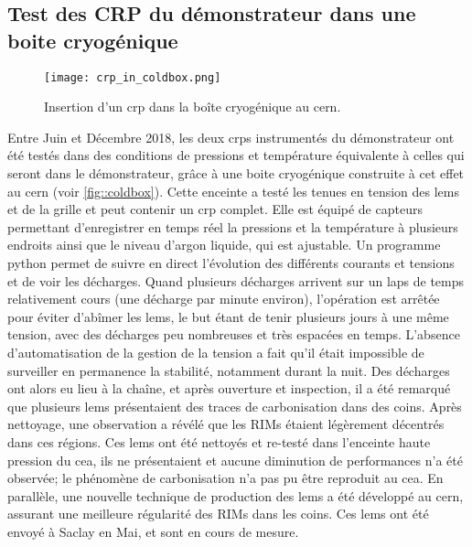     \subsection{Test des CRP du démonstrateur \SSS{} dans une boite cryogénique}\label{sec::cold_box}
      
      \begin{figure}[htpb]
        \centering
        \texttt{[image: crp\_in\_coldbox.png]}
        \caption[Insertion d'un CRP dans la boîte cryogénique au CERN.]{\label{fig::coldbox}Insertion d'un \gls{crp} dans la boîte cryogénique au \gls{cern}.}
      \end{figure}
      Entre Juin et Décembre 2018, les deux \glspl{crp} instrumentés du démonstrateur \SSS{} ont été testés dans des conditions de pressions et température équivalente à celles qui seront dans le démonstrateur, grâce à une boite cryogénique construite à cet effet au \gls{cern} (voir \autoref{fig::coldbox}). Cette enceinte a testé les tenues en tension des \glspl{lem} et de la grille et peut contenir un \gls{crp} complet. Elle est équipé de capteurs permettant d'enregistrer en temps réel la pressions et la température à plusieurs endroits ainsi que le niveau d'argon liquide, qui est ajustable. 
      Un programme python permet de suivre en direct l'évolution des différents courants et tensions et de voir les décharges. Quand plusieurs décharges arrivent sur un laps de temps relativement cours (une décharge par minute environ), l'opération est arrêtée pour éviter d'abîmer les \glspl{lem}, le but étant de tenir plusieurs jours à une même tension, avec des décharges peu nombreuses et très espacées en temps. L'absence d'automatisation de la gestion de la tension a fait qu'il était impossible de surveiller en permanence la stabilité, notamment durant la nuit. Des décharges ont alors eu lieu à la chaîne, et après ouverture et inspection, il a été remarqué que plusieurs \glspl{lem} présentaient des traces de carbonisation dans des coins. Après nettoyage, une observation a révélé que les RIMs étaient légèrement décentrés dans ces régions. Ces \glspl{lem} ont été nettoyés et re-testé dans l'enceinte haute pression du \gls{cea}, ils ne présentaient et aucune diminution de performances n'a été observée; le phénomène de carbonisation n'a pas pu être reproduit au \gls{cea}. En parallèle, une nouvelle technique de production des \glspl{lem} a été développé au \gls{cern}, assurant une meilleure régularité des RIMs dans les coins. Ces \glspl{lem} ont été envoyé à Saclay en Mai, et sont en cours de mesure.
        
